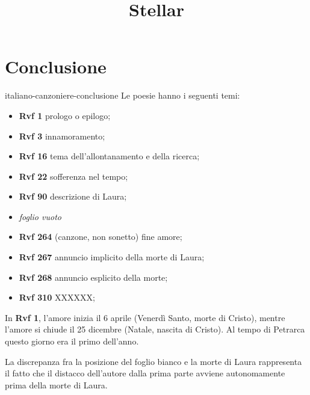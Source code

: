 \documentclass[preview]{standalone}
\begin{document}
\title{Stellar}
\genpage

\section{Conclusione}

\begin{snippet}{italiano-canzoniere-conclusione}
    Le poesie hanno i seguenti temi:
    \begin{itemize}
        \item \textbf{Rvf 1} prologo o epilogo;
        \item \textbf{Rvf 3} innamoramento;
        \item \textbf{Rvf 16} tema dell'allontanamento e della ricerca;
        \item \textbf{Rvf 22} sofferenza nel tempo;
        \item \textbf{Rvf 90} descrizione di Laura;
        \item \textit{foglio vuoto}
        \item \textbf{Rvf 264} (canzone, non sonetto) fine amore;
        \item \textbf{Rvf 267} annuncio implicito della morte di Laura;
        \item \textbf{Rvf 268} annuncio esplicito della morte;
        \item \textbf{Rvf 310} XXXXXX;
    \end{itemize}
    
    In \textbf{Rvf 1}, l'amore inizia il 6 aprile (Venerdì Santo, morte di Cristo),
    mentre l'amore si chiude il 25 dicembre (Natale, nascita di Cristo).
    Al tempo di Petrarca questo giorno era il primo dell'anno. 
    
    La discrepanza fra la posizione del foglio bianco e la morte di Laura rappresenta il
    fatto che il distacco dell'autore dalla prima parte
    avviene autonomamente prima della morte di Laura.
\end{snippet}
\end{document}
